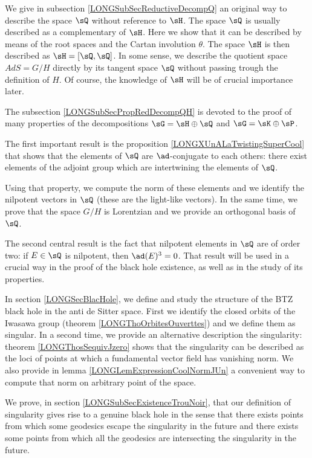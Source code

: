 We give in subsection \ref{LONGSubSecReductiveDecompQ} an original way to describe the space $\sQ$ without reference to $\sH$. The space $\sQ$ is usually described as a complementary of $\sH$. Here we show that it can be described by means of the root spaces and the Cartan involution $\theta$. The space $\sH$ is then described as $\sH=[\sQ,\sQ]$. In some sense, we describe the quotient space $AdS=G/H$ directly by its tangent space $\sQ$ without passing trough the definition of $H$. Of course, the knowledge of $\sH$ will be of crucial importance later.


The subsection \ref{LONGSubSecPropRedDecompQH} is devoted to the proof of many properties of the decompositions $\sG=\sH\oplus\sQ$ and $\sG=\sK\oplus\sP$.


The first important result is the proposition \ref{LONGXUnALaTwistingSuperCool} that shows that the elements of $\sQ$ are $\ad$-conjugate to each others: there exist elements of the adjoint group which are intertwining the elements of $\sQ$.

Using that property, we compute the norm of these elements and we identify the nilpotent vectors in $\sQ$ (these are the light-like vectors). In the same time, we prove that the space $G/H$ is Lorentzian and we provide an orthogonal basis of $\sQ$.

The second central result is the fact that nilpotent elements in $\sQ$ are of order two: if $E\in\sQ$ is nilpotent, then $\ad(E)^3=0$. That result will be used in a crucial way in the proof of the black hole existence, as well as in the study of its properties.

In section \ref{LONGSecBlacHole}, we define and study the structure of the BTZ black hole in the anti de Sitter space. First we identify the closed orbits of the Iwasawa group (theorem \ref{LONGThoOrbitesOuverttes}) and we define them as singular. In a second time, we provide an alternative description the singularity: theorem \ref{LONGThosSequivJzero} shows that the singularity can be described as the loci of points at which a fundamental vector field has vanishing norm. We also provide in lemma \ref{LONGLemExpressionCoolNormJUn} a convenient way to compute that norm on arbitrary point of the space.

We prove, in section \ref{LONGSubSecExistenceTrouNoir}, that our definition of singularity gives rise to a genuine black hole in the sense that there exists points from which some geodesics escape the singularity in the future and there exists some points from which all the geodesics are intersecting the singularity in the future.

